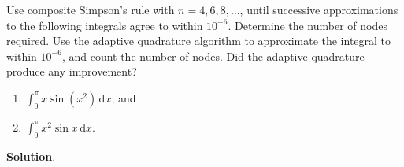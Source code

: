 \documentclass[11pt]{article}
\theoremstyle{break}
\newcommand{\ddi}{\text{$\,$d}}
\numberwithin{equation}{theorem}
\begin{document}
\newpage
\begin{problem}\label{problem 13} %
    Use composite Simpson's rule with $n=4, 6, 8,\dots$, until successive approximations to the following integrals agree to within $10^{-6}$. Determine the number of nodes required. Use the adaptive quadrature algorithm to approximate the integral to within $10^{-6}$, and count the number of nodes. Did the adaptive quadrature produce any improvement? \vspace{-1em}
    \begin{multicols}{2}
        \begin{enumerate}
            \item $\displaystyle\int_{0}^{\pi}x\sin(x^2)\ddi x$; and
            \item $\displaystyle\int_{0}^{\pi}x^2\sin x\ddi x$.
        \end{enumerate}
    \end{multicols}
    \vspace{0.1em}
\end{problem}
\textbf{Solution}. 
\end{document}
